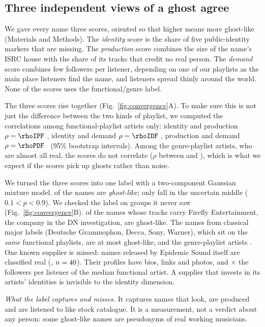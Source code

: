 \documentclass[9pt,twocolumn,twoside]{pnas-new}
\begin{document}
\subsection*{Three independent views of a ghost agree}
We gave every name three scores, oriented so that higher means more ghost-like (Materials and Methods). The \emph{identity} score is the share of five public-identity markers that are missing. The \emph{production} score combines the size of the name's ISRC house with the share of its tracks that credit no real person. The \emph{demand} score combines few followers per listener, depending on one of our playlists as the main place listeners find the name, and listeners spread thinly around the world. None of the scores uses the functional/genre label.

The three scores rise together (Fig.~\ref{fig:convergence}A). To make sure this is not just the difference between the two kinds of playlist, we computed the correlations among functional-playlist artists only: identity and production $\rho=\rhoIPF$ \rhoIPFCI, identity and demand $\rho=\rhoIDF$ \rhoIDFCI, production and demand $\rho=\rhoPDF$ \rhoPDFCI\ (95\% bootstrap intervals). Among the genre-playlist artists, who are almost all real, the scores do not correlate ($\rho$ between \rhoPDG{} and \rhoIPG), which is what we expect if the scores pick up ghosts rather than noise.

We turned the three scores into one label with a two-component Gaussian mixture model. \nGhost{} of the \nNames{} names are \emph{ghost-like}; only \uncertainShare{} fall in the uncertain middle ($0.1<p<0.9$). We checked the label on groups it never saw (Fig.~\ref{fig:convergence}B).  of the \nFirefly{} names whose tracks carry Firefly Entertainment, the company in the DN investigation, are ghost-like. The \nMajors{} names from classical major labels (Deutsche Grammophon, Decca, Sony, Warner), which sit on the \emph{same} functional playlists, are at most  ghost-like, and the genre-playlist artists . One known supplier is missed: names released by Epidemic Sound itself are classified real (, $n=40$). Their profiles have bios, links and photos, and \epidemicFplRatio$\times$ the followers per listener of the median functional artist. A supplier that invests in its artists' identities is invisible to the identity dimension.

\emph{What the label captures and misses.} It captures names that look, are produced and are listened to like stock catalogue. It is a measurement, not a verdict about any person: some ghost-like names are pseudonyms of real working musicians.
\end{document}
